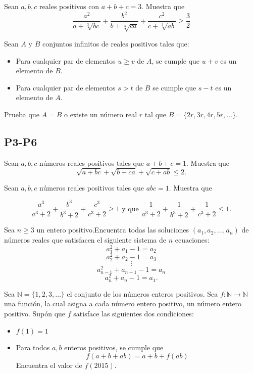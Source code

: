 \documentclass[11pt]{scrartcl}
\begin{document}
\begin{problem}
[2014/5] Sean $a,b,c$ reales positivos con $a+b+c=3$. Muestra que 
$$\frac{a^2}{a+\sqrt[3]{bc}}+\frac{b^2}{b+\sqrt[3]{ca}}+\frac{c^2}{c+\sqrt[3]{ab}}\geq \frac 3 2$$
\end{problem}

\begin{problem} [2024/5]
    Sean $A$ y $B$ conjuntos infinitos de reales positivos tales que:
    \begin{itemize}
        \item Para cualquier par de elementos $u \geq v$ de $A$, se cumple que $u+v$ es un elemento de $B$.
        \item Para cualquier par de elementos $s>t$ de $B$ se cumple que $s-t$ es un elemento de $A$. 
    \end{itemize}
    Prueba que $A=B$ o existe un número real $r$ tal que $B=\{ 2r,3r,4r,5r,\ldots \}$.
\end{problem}


\subsection{P3-P6}
\begin{problem} [2007/3]

    Sean $a,b,c$ números reales positivos tales que $a+b+c=1$. Muestra que 
\[\sqrt{a+bc}+\sqrt{b+ca}+\sqrt{c+ab}\leq 2.\]
    
\end{problem}

\begin{problem} [2009/3]

    Sean $a,b,c$ números reales positivos tales que $abc=1$. Muestra que

\[\frac{a^3}{a^3+2}+\frac{b^3}{b^3+2}+\frac{c^3}{c^3+2}\ge1\text{ y que }\frac1{a^3+2}+\frac1{b^3+2}+\frac1{c^3+2}\le1.\]
    
\end{problem}
\begin{problem}
[2011/3] Sea $n\geq 3$ un entero positivo.Encuentra todas las soluciones $(a_1,a_2,\ldots,a_n)$ de números reales que satisfacen el siguiente sistema de $n$ ecuaciones:
$$a_1^2+a_1-1=a_2$$
$$a_2^2+a_2-1=a_3$$
$$\vdots$$
$$a_{n-1}^2+a_{n-1}-1=a_n$$
$$a_n^2+a_n-1=a_1.$$
\end{problem}

\begin{problem}
[2015/3] Sea $\mathbb{N}=\{ 1,2,3,\ldots \}$ el conjunto de los números enteros positivos. Sea $f: \mathbb{N} \rightarrow \mathbb{N}$ una función, la cual asigna a cada número entero positivo, un número entero positivo. Supón que $f$ satisface las siguientes dos condiciones: 
\begin{itemize}
\item $f(1)=1$
\item Para todos $a,b$ enteros positivos, se cumple que 
$$f(a+b+ab)=a+b+f(ab)$$
Encuentra el valor de $f(2015)$.
\end{itemize}
\end{problem}
\end{document}
